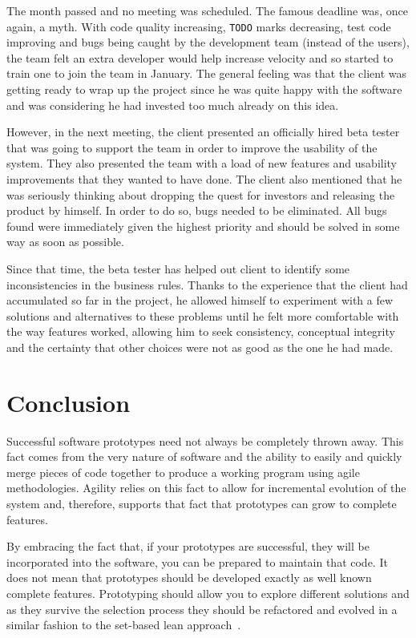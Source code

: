 \documentclass[lnbip]{svmultln}
\begin{document}
The month passed and no meeting was scheduled. The famous deadline
was, once again, a myth. With code quality increasing, \texttt{TODO}
marks decreasing, test code improving and bugs being caught by the
development team (instead of the users), the team felt an extra
developer would help increase velocity and so started to train one to
join the team in January. The general feeling was that the client was
getting ready to wrap up the project since he was quite happy with the
software and was considering he had invested too much already on this
idea.

However, in the next meeting, the client presented an officially hired
beta tester that was going to support the team in order to improve the
usability of the system. They also presented the team with a load of
new features and usability improvements that they wanted to have
done. The client also mentioned that he was seriously thinking about
dropping the quest for investors and releasing the product by
himself. In order to do so, bugs needed to be eliminated. All bugs
found were immediately given the highest priority and should be solved
in some way as soon as possible.

Since that time, the beta tester has helped out client to identify
some inconsistencies in the business rules. Thanks to the experience
that the client had accumulated so far in the project, he allowed
himself to experiment with a few solutions and alternatives to these
problems until he felt more comfortable with the way features worked,
allowing him to seek consistency, conceptual integrity and the
certainty that other choices were not as good as the one he had made.

\section{Conclusion}
\label{sec:conclusion}

Successful software prototypes need not always be completely thrown
away. This fact comes from the very nature of software and the ability
to easily and quickly merge pieces of code together to produce a
working program using agile methodologies. Agility relies on this fact
to allow for incremental evolution of the system and, therefore,
supports that fact that prototypes can grow to complete features.

By embracing the fact that, if your prototypes are successful, they
will be incorporated into the software, you can be prepared to
maintain that code. It does not mean that prototypes should be
developed exactly as well known complete features. Prototyping should
allow you to explore different solutions and as they survive the
selection process they should be refactored and evolved in a similar
fashion to the set-based lean approach~\cite{Poppendieck2009}.
\end{document}

